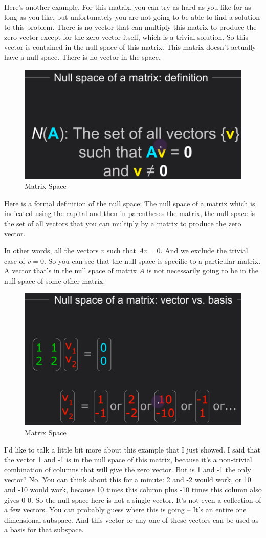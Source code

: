 \documentclass[fleqn,10pt]{olplainarticle}
\theoremstyle{definition}
\theoremstyle{remark}
\begin{document}
Here's another example. For this matrix, you can try as hard as you like for as long as you like, but unfortunately you are not going to be able to find a solution to this problem. There is no vector that can multiply this matrix to produce the zero vector except for the zero vector itself, which is a trivial solution. So this vector is contained in the null space of this matrix. This matrix doesn't actually have a null space. There is no vector in the space.

\begin{figure}[ht]
	\centering
	\includegraphics[width=0.3\linewidth]{images/matrix-space-19.png}
	\caption{Matrix Space}
	\label{fig:matrix_space_19}
\end{figure}

Here is a formal definition of the null space: The null space of a matrix which is indicated using the capital and then in parentheses the matrix, the null space is the set of all vectors that you can multiply by a matrix to produce the zero vector.

In other words, all the vectors $v$ such that $Av=0$. And we exclude the trivial case of $v=0$. So you can see that the null space is specific to a particular matrix. A vector that's in the null space of matrix $A$ is not necessarily going to be in the null space of some other matrix.

\begin{figure}[ht]
	\centering
	\includegraphics[width=0.4\linewidth]{images/matrix-space-20.png}
	\caption{Matrix Space}
	\label{fig:matrix_space_20}
\end{figure}

I'd like to talk a little bit more about this example that I just showed. I said that the vector 1 and -1 is in the null space of this matrix, because it's a non-trivial combination of columns that will give the zero vector. But is 1 and -1 the only vector? No. You can think about this for a minute: 2 and -2 would work, or 10 and -10 would work, because 10 times this column plus -10 times this column also gives 0 0. So the null space here is not a single vector. It's not even a collection of a few vectors. You can probably guess where this is going -- It's an entire one dimensional subspace. And this vector or any one of these vectors can be used as a basis for that subspace.
\end{document}
